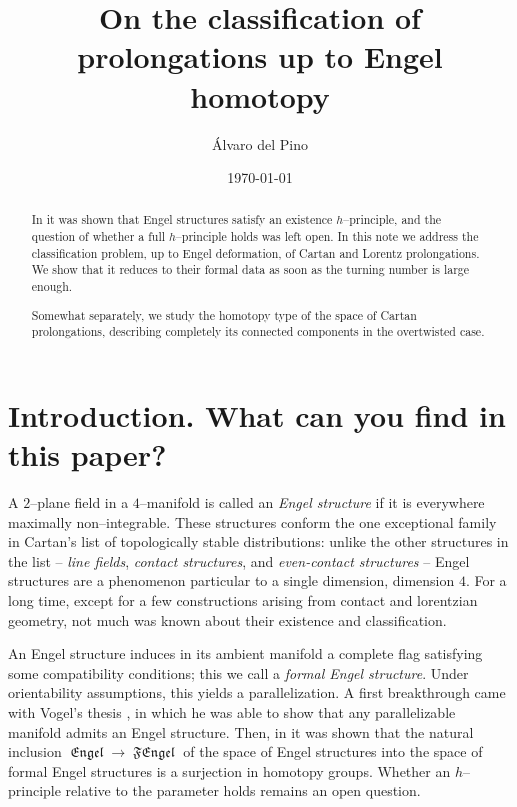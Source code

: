 \documentclass[10pt]{amsart}
\newcommand{\Engel}{\operatorname{\mathfrak{Engel}}}
\newcommand{\FEngel}{\operatorname{\mathfrak{FEngel}}}
\theoremstyle{definition}
\begin{document}
 

\title{On the classification of prolongations up to Engel homotopy}

\date{\today}


\author{\'Alvaro del Pino}
\address{Universidad Aut\'onoma de Madrid and Instituto de Ciencias Matem\'aticas -- CSIC.
C. Nicol\'as Cabrera, 13--15, 28049, Madrid, Spain.}


\begin{abstract}
In \cite{CPPP} it was shown that Engel structures satisfy an existence $h$--principle, and the question of whether a full $h$--principle holds was left open. In this note we address the classification problem, up to Engel deformation, of Cartan and Lorentz prolongations. We show that it reduces to their formal data as soon as the turning number is large enough.

Somewhat separately, we study the homotopy type of the space of Cartan prolongations, describing completely its connected components in the overtwisted case.
\end{abstract}

\maketitle


\section{Introduction. What can you find in this paper?}

A $2$--plane field in a $4$--manifold is called an \textsl{Engel structure} if it is everywhere maximally non--integrable. These structures conform the one exceptional family in Cartan's list of topologically stable distributions: unlike the other structures in the list -- \emph{line fields}, \textsl{contact structures}, and \textsl{even-contact structures} -- Engel structures are a phenomenon particular to a single dimension, dimension $4$. For a long time, except for a few constructions arising from contact and lorentzian geometry, not much was known about their existence and classification.

An Engel structure induces in its ambient manifold a complete flag satisfying some compatibility conditions; this we call a \textsl{formal Engel structure}. Under orientability assumptions, this yields a parallelization. A first breakthrough came with Vogel's thesis \cite{Vo}, in which he was able to show that any parallelizable manifold admits an Engel structure. Then, in \cite{CPPP} it was shown that the natural inclusion $\Engel \to \FEngel$ of the space of Engel structures into the space of formal Engel structures is a surjection in homotopy groups. Whether an $h$--principle relative to the parameter holds remains an open question. 
\end{document}
